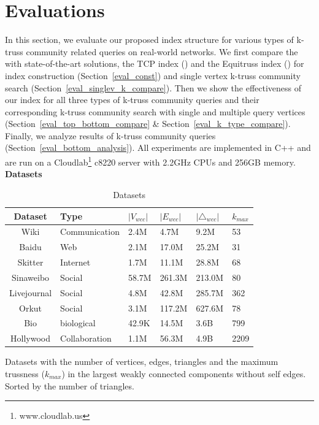 \section{Evaluations}
\label{evaluation}

In this section, we evaluate our proposed index structure for various types of k-truss community related queries on real-world networks. We first compare the \twolevelindex{} with state-of-the-art solutions, the TCP index (\cite{huang2014querying}) and the Equitruss index (\cite{akbas2017truss}) for index construction (Section~\ref{eval_const}) and single vertex k-truss community search (Section~\ref{eval_singlev_k_compare}). Then we show the effectiveness of our index for all three types of \toplevelprob{} k-truss community queries and their corresponding k-truss community search with single and multiple query vertices (Section~\ref{eval_top_bottom_compare} \& Section~\ref{eval_k_type_compare}). Finally, we analyze results of \bottomlevelprob{} k-truss community queries (Section~\ref{eval_bottom_analysis}). All experiments are implemented in C++ and are run on a Cloudlab\footnote{www.cloudlab.us} c8220 server with 2.2GHz CPUs and 256GB memory. 
\vskip 0.1in \noindent \textbf{Datasets} 

\begin{table}
\caption{Datasets}
\label{table:datasets} 
\begin{threeparttable}
	\centering
		\begin{tabularx}{\textwidth}{c|*{5}{Y}} 
		\toprule
			Dataset & Type & $|V_{wcc}|$ & $|E_{wcc}|$ & $|{\triangle}_{wcc}|$ & $k_{max}$ \\
			\midrule
			Wiki & Communication & 2.4M & 4.7M & 9.2M & 53 \\ 
			Baidu & Web & 2.1M & 17.0M & 25.2M & 31 \\
			Skitter & Internet & 1.7M & 11.1M & 28.8M & 68 \\ 
			Sinaweibo & Social & 58.7M & 261.3M & 213.0M & 80 \\ 
			Livejournal & Social & 4.8M & 42.8M & 285.7M & 362 \\ 
			Orkut & Social & 3.1M & 117.2M & 627.6M & 78 \\
			Bio & biological & 42.9K & 14.5M & 3.6B & 799 \\
			Hollywood & Collaboration & 1.1M & 56.3M & 4.9B & 2209 \\
			\bottomrule
			\end{tabularx}
			\begin{tablenotes}
				\item Datasets with the number of vertices, edges, triangles and the maximum trussness ($k_{max}$) in the largest weakly connected components without self edges. Sorted by the number of triangles.
			\end{tablenotes}
		\end{threeparttable}
\end{table}

